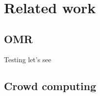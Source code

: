 \chapter{Related work}

\section{OMR}
Testing \citep{Valk2019} let's see

\section{Crowd computing}
